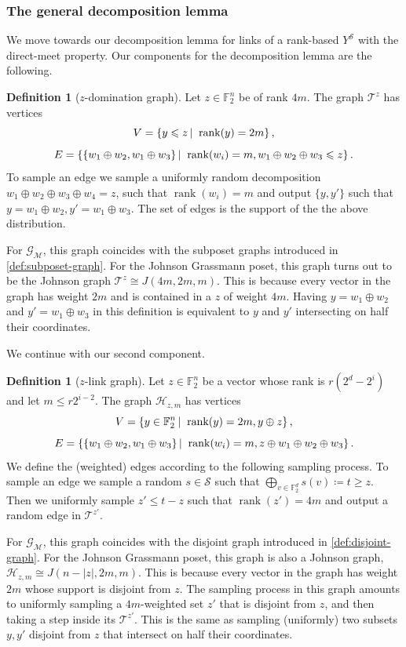 \documentclass[10pt,a4paper]{article}
\newcommand{\prettyref}[1]{\cref{#1}}
\theoremstyle{definition}
\newtheorem{definition}[theorem]{Definition}
\theoremstyle{remark}
\newcommand\sett[2]{\left\{ #1 \left| \; \vphantom{#1 #2} \right. #2  \right\}}
\newcommand{\set}[1]{\{#1\}}
\newcommand{\F}{\mathbb{F}}
\DeclareMathOperator{\rank}{rank}
\renewcommand{\leq}{\leqslant}
\renewcommand{\geq}{\geqslant}
\numberwithin{equation}{section}
\let\pref=\prettyref
\def\Y{Y}
\def\MP{\mathcal{M}}
\begin{document}
\subsubsection{The general decomposition lemma}
We move towards our decomposition lemma for links of a rank-based \(\Y^{\mathcal{S}}\) with the direct-meet property. Our components for the decomposition lemma are the following.
\begin{definition}[\(z\)-domination graph]
    Let \(z \in \F_2^n\) be of rank \(4m\). The graph \(\mathcal{T}^{z}\) has vertices
    \[V = \sett{y \leq z}{\rank(y)=2m},\]
    \[E = \sett{\set{w_1 \oplus w_2, w_1 \oplus w_3}}{\rank(w_i) = m, w_1 \oplus w_2 \oplus w_3 \leq z}.\]
    To sample an edge we sample a uniformly random decomposition \(w_1\oplus w_2 \oplus w_3 \oplus w_4 = z\), such that \(\rank(w_i) = m\) and output \(\set{y,y'}\) such that \(y=w_1 \oplus w_2, y'=w_1 \oplus w_3\). The set of edges is the support of the the above distribution.
\end{definition}
For \(\mathcal{G}_{\MP}\), this graph coincides with the subposet graphs introduced in \pref{def:subposet-graph}. For the Johnson Grassmann poset, this graph turns out to be the Johnson graph \(\mathcal{T}^z \cong J(4m,2m,m)\). This is because every vector in the graph has weight \(2m\) and is contained in a \(z\) of weight \(4m\). Having \(y=w_1 \oplus w_2\) and \(y'=w_1 \oplus w_3\) in this definition is equivalent to \(y\) and \(y'\) intersecting on half their coordinates.

We continue with our second component.

\begin{definition}[\(z\)-link graph] \label{def:abstract-link-graph}
    Let \(z \in \F_2^n\) be a vector whose rank is \(r(2^d - 2^i)\) and let \(m \leq r2^{i-2}\). The graph \(\mathcal{H}_{z,m}\) has vertices
    \[V = \sett{y \in \F^n_2}{\rank(y)=2m, y \oplus z},\]
    \[E = \sett{\set{w_1 \oplus w_2, w_1 \oplus w_3}}{\rank(w_i)=m, z \oplus w_1 \oplus w_2 \oplus w_3}.\]
    We define the (weighted) edges according to the following sampling process. To sample an edge we sample a random \(s \in \mathcal{S}\) such that \(\bigoplus_{v \in \F_2^d}s(v) \coloneqq t \geq z\). Then we uniformly sample \(z' \leq t-z\) such that \(\rank(z') = 4m\) and output a random edge in \(\mathcal{T}^{z'}\).
\end{definition}
For \(\mathcal{G}_{\MP}\), this graph coincides with the disjoint graph introduced in \pref{def:disjoint-graph}. For the Johnson Grassmann poset, this graph is also a Johnson graph, \(\mathcal{H}_{z,m} \cong J(n-|z|,2m,m)\). This is because every vector in the graph has weight \(2m\) whose support is disjoint from \(z\). The sampling process in this graph amounts to uniformly sampling a \(4m\)-weighted set \(z'\) that is disjoint from \(z\), and then taking a step inside its \(\mathcal{T}^{z'}\). This is the same as sampling (uniformly) two subsets \(y,y'\) disjoint from \(z\) that intersect on half their coordinates.
\end{document}
